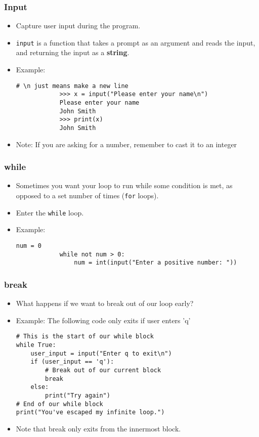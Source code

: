 \documentclass[notes]{beamer}
\begin{document}
	\begin{frame}[fragile]
		\frametitle{Input}
		\begin{itemize}
			\item Capture user input during the program.
			\item \lstinline|input| is a function that takes a prompt as an argument and reads the input, and returning the input as a \textbf{string}.
			\pause
			\item Example:
			\begin{lstlisting}[basicstyle=\scriptsize\tt]
			# \n just means make a new line
			>>> x = input("Please enter your name\n")
			Please enter your name
			John Smith
			>>> print(x)
			John Smith
			\end{lstlisting}
			\pause
			\item Note: If you are asking for a number, remember to cast it to an integer
		\end{itemize}
	\end{frame}	
	
	\begin{frame}[fragile]
		\frametitle{while}
		\begin{itemize}
			\item Sometimes you want your loop to run while some condition is met, as opposed to a set number of times (\lstinline|for| loops).
			\item Enter the \lstinline|while| loop.
			\pause
			\item Example:
			\begin{lstlisting}[basicstyle=\scriptsize\tt]
			num = 0
			while not num > 0:
			    num = int(input("Enter a positive number: "))
			\end{lstlisting}

		\end{itemize}
	\end{frame}
	
	\begin{frame}[fragile]
		\frametitle{break}
		\begin{itemize}
			\item What happens if we want to break out of our loop early?
			\item Example:
			The following code only exits if user enters 'q'
			\begin{lstlisting}[basicstyle=\scriptsize\tt]
# This is the start of our while block
while True:
	user_input = input("Enter q to exit\n")
    if (user_input == 'q'):
        # Break out of our current block
        break
    else:
        print("Try again")
# End of our while block
print("You've escaped my infinite loop.")
			\end{lstlisting}
			\pause
			\item Note that break only exits from the innermost block.

		\end{itemize}
	\end{frame}
	
\end{document}
